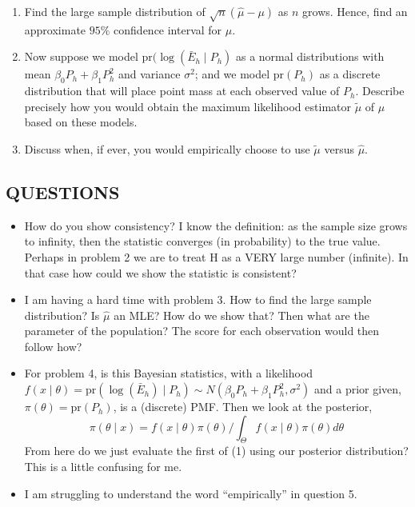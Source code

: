 \documentclass[letterpaper, 12pt]{article}
\newcommand{\pr}{\text{pr}}
\newcommand{\sbs}{\;|\;} %
\begin{document}
\begin{enumerate}
\begin{proof}
\end{proof}
\item
Find the large sample distribution of $\sqrt{n}(\hat{\mu} - \mu)$ as $n$ grows. Hence, find an approximate $95\%$ confidence interval for $\mu$.
\item
Now suppose we model $\pr(\log(\bar{E}_h \sbs P_h)$ as a normal distributions with mean $\beta_0 P_h + \beta_1 P_h^2$ and variance $\sigma^2$; and we model $\pr(P_h)$ as a discrete distribution that will place point mass at each observed value of $P_h$. Describe precisely how you would obtain the maximum likelihood estimator $\tilde{\mu}$ of $\mu$ based on these models.
\item
Discuss when, if ever, you would empirically choose to use $\tilde{\mu}$ versus $\hat{\mu}$.
\end{enumerate}
\subsection{QUESTIONS}
\begin{itemize}
\item
How do you show consistency? I know the definition: as the sample size grows to infinity, then the statistic converges (in probability) to the true value. Perhaps in problem 2 we are to treat H as a VERY large number (infinite). In that case how could we show the statistic is consistent?
\item
I am having a hard time with problem 3. How to find the large sample distribution? Is $\hat{\mu}$ an MLE? How do we show that? Then what are the parameter of the population? The score for each observation would then follow how?
\item
For problem 4, is this Bayesian statistics, with a likelihood $f(x \sbs \theta) = \pr(\log(\bar{E}_h) \sbs P_h) \sim N(\beta_0 P_h + \beta_1 P_h^2, \sigma^2)$ and a prior given, $\pi(\theta)=\pr(P_h)$, is a (discrete) PMF. Then we look at the posterior, 
\begin{equation}
\pi(\theta \sbs x) = f(x \sbs \theta) \pi(\theta) / \int_\Theta f(x \sbs \theta) \pi(\theta) d\theta
\end{equation}
From here do we just evaluate the first of (1) using our posterior distribution? This is a little confusing for me.
\item
I am struggling to understand the word ``empirically'' in question 5.
\end{itemize}
\end{document}
